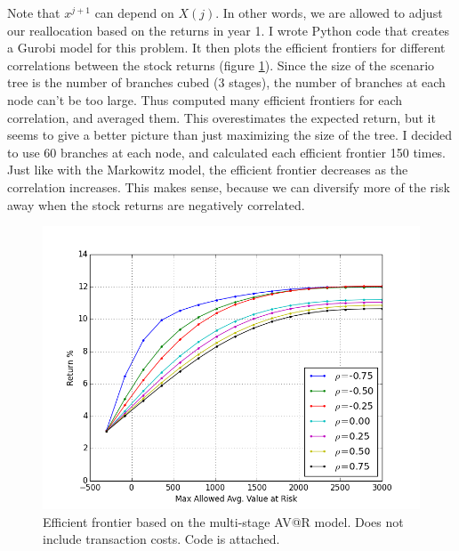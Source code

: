 \documentclass{amsart}
\theoremstyle{definition}
\theoremstyle{remark}
\begin{document}
Note that $x^{j+1}$ can depend on $X(j)$. In other words, we are allowed to adjust our reallocation based on the returns in year 1. I wrote Python code that creates a Gurobi model for this problem. It then plots the efficient frontiers for different correlations between the stock returns (figure \ref{fig:multi_stage_no_transaction_costs}). Since the size of the scenario tree is the number of branches cubed (3 stages), the number of branches at each node can't be too large. Thus computed many efficient frontiers for each correlation, and averaged them. This overestimates the expected return, but it seems to give a better picture than just maximizing the size of the tree. I decided to use 60 branches at each node, and calculated each efficient frontier 150 times.
Just like with the Markowitz model, the efficient frontier decreases as the correlation increases. This makes sense, because we can diversify more of the risk away when the stock returns are negatively correlated.
\begin{figure}
\centering
\includegraphics[scale=0.5]{multi_stage_no_transaction_costs.png}
\caption{Efficient frontier based on the multi-stage AV@R model. Does not include transaction costs.  Code is attached.}
\label{fig:multi_stage_no_transaction_costs}
\end{figure}
\end{document}
